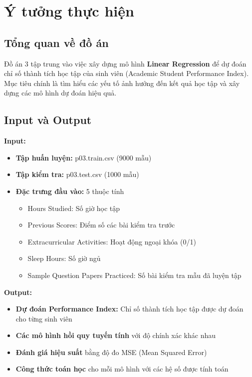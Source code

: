 \section{Ý tưởng thực hiện}

\subsection{Tổng quan về đồ án}
Đồ án 3 tập trung vào việc xây dựng mô hình \textbf{Linear Regression} để dự đoán chỉ số thành tích học tập của sinh viên (Academic Student Performance Index). Mục tiêu chính là tìm hiểu các yếu tố ảnh hưởng đến kết quả học tập và xây dựng các mô hình dự đoán hiệu quả.

\subsection{Input và Output}
\textbf{Input:}
\begin{itemize}
	\item \textbf{Tập huấn luyện:} p03.train.csv (9000 mẫu)
	\item \textbf{Tập kiểm tra:} p03.test.csv (1000 mẫu)
	\item \textbf{Đặc trưng đầu vào:} 5 thuộc tính
	      \begin{itemize}
		      \item Hours Studied: Số giờ học tập
		      \item Previous Scores: Điểm số các bài kiểm tra trước
		      \item Extracurricular Activities: Hoạt động ngoại khóa (0/1)
		      \item Sleep Hours: Số giờ ngủ
		      \item Sample Question Papers Practiced: Số bài kiểm tra mẫu đã luyện tập
	      \end{itemize}
\end{itemize}

\textbf{Output:}
\begin{itemize}
	\item \textbf{Dự đoán Performance Index:} Chỉ số thành tích học tập được dự đoán cho từng sinh viên
	\item \textbf{Các mô hình hồi quy tuyến tính} với độ chính xác khác nhau
	\item \textbf{Đánh giá hiệu suất} bằng độ đo MSE (Mean Squared Error)
	\item \textbf{Công thức toán học} cho mỗi mô hình với các hệ số được tính toán
\end{itemize}

